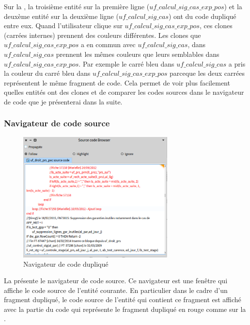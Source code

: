 \documentclass[a4paper]{article}
\begin{document}
Sur la , la troisième entité sur la première ligne ($uf\_calcul\_sig\_cas\_exp\_pos$) et la deuxème entité sur la deuxième ligne ($uf\_calcul\_sig\_cas$) ont du code dupliqué entre eux.
Quand l'utilisateur clique sur $uf\_calcul\_sig\_cas\_exp\_pos$, ces clones (carrées internes) prennent des couleurs différentes.
Les clones que $uf\_calcul\_sig\_cas\_exp\_pos$ a en commun avec $uf\_calcul\_sig\_cas$, dans $uf\_calcul\_sig\_cas$ prennent les mêmes couleurs que leurs semblables dans $uf\_calcul\_sig\_cas\_exp\_pos$.
Par exemple le carré bleu dans $uf\_calcul\_sig\_cas$ a pris la couleur du carré bleu  dans $uf\_calcul\_sig\_cas\_exp\_pos$
parceque les deux carrées représentent le même fragment de code.  
Cela permet de voir plus facilement quelles entités ont des clones et de comparer les codes sources dans le navigateur de code que je présenterai dans la suite. 

\subsubsection{Navigateur de code source}
\begin{figure}[htbp]
  \begin{center}
  \includegraphics[width=0.7\textwidth]{./figures/sourceCodeBrowser.png}
  \caption{Navigateur de code dupliqué}
  \label{fig:sourceCodeBrowser}
\end{center}
\vspace{-0.3cm}
\end{figure}
La  présente le navigateur de code source. 
Ce navigateur est une fenêtre qui affiche le code source de l'entité courante.
En particulier dans le cadre d'un fragment dupliqué, le code source de l'entité qui contient ce fragment est affiché avec la partie du code qui représente le fragment dupliqué  en rouge comme sur la .
\end{document}
